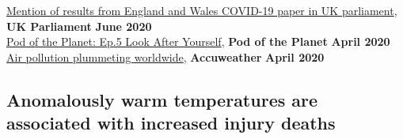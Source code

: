 \href{https://twitter.com/rmiparks/status/1268082491530850305}{Mention of results from England and Wales COVID-19 paper in UK parliament}, \textbf{UK Parliament} \hfill \textbf{June 2020}\\
\href{https://open.spotify.com/episode/2D9VJnsJ1dix4oURbusan2}{Pod of the Planet: Ep.5 Look After Yourself}, \textbf{Pod of the Planet} \hfill \textbf{April 2020}\\
\href{https://www.accuweather.com/en/videos/air-pollution-plummeting-worldwide/D6FnwOv3}{Air pollution plummeting worldwide}, \textbf{Accuweather} \hfill \textbf{April 2020}


\subsection*{Anomalously warm temperatures are associated with increased injury deaths}


